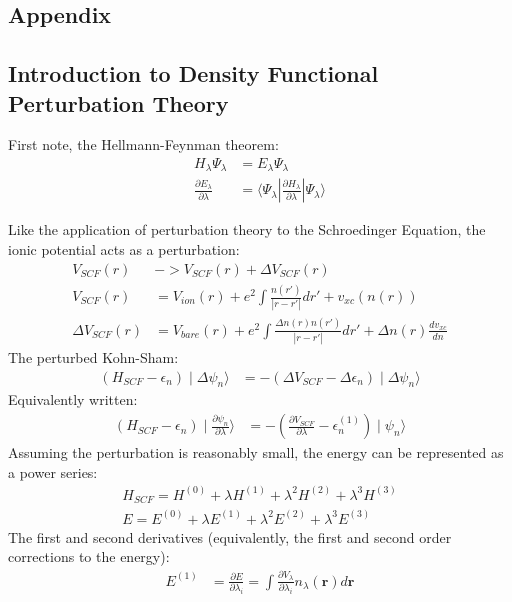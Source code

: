 \documentclass{article}
\numberwithin{equation}{section}
\begin{document}
\begin{spacing}{1.0}
\newpage
\section{Appendix}
\subsection*{Introduction to Density Functional Perturbation Theory}
First note, the Hellmann-Feynman theorem:
\begin{align*}
	H_{\lambda}\Psi_{\lambda}&=E_{\lambda}\Psi_{\lambda}\\
        \frac{\partial E_{\lambda}}{\partial \lambda}&=\langle \Psi_{\lambda}|\frac{\partial H_{\lambda}}{\partial \lambda}|\Psi_{\lambda}\rangle
\end{align*}

Like the application of perturbation theory to the Schroedinger Equation, the ionic potential acts as a perturbation:
\begin{align*}
        V_{SCF}(r)&->V_{SCF}(r)+\Delta V_{SCF}(r)\\
	V_{SCF}(r)&=V_{ion}(r)+e^2\int \frac{n(r')}{|r-r'|}dr'+v_{xc}(n(r))\\
	\Delta V_{SCF}(r)&=V_{bare}(r)+e^2\int \frac{\Delta n(r)n(r')}{|r-r'|}dr'+\Delta n(r)\frac{dv_{xc}}{dn}
\end{align*}
The perturbed Kohn-Sham:
\begin{align*}
	(H_{SCF}-\epsilon_n)\mid\Delta\psi_n\rangle&=-(\Delta V_{SCF}-\Delta \epsilon_n)\mid\Delta\psi_n\rangle
\end{align*}
Equivalently written:
\begin{align*}
	(H_{SCF}-\epsilon_n)\mid\frac{\partial \psi_n}{\partial \lambda}\rangle&=-(\frac{\partial V_{SCF}}{\partial \lambda}-\epsilon_n^{(1)})\mid\psi_n\rangle        
\end{align*}
Assuming the perturbation is reasonably small, the energy can be represented as a power series:
\begin{align*}
	H_{SCF}=H^{(0)}+\lambda H^{(1)}+\lambda^2 H^{(2)}+\lambda^3 H^{(3)}\\
        E=E^{(0)}+\lambda E^{(1)}+\lambda^2 E^{(2)}+\lambda^3 E^{(3)}
\end{align*}
The first and second derivatives (equivalently, the first and second order corrections to the energy):
\begin{align*}
E^{(1)}&=\frac{\partial E}{\partial \lambda_i}=\int \frac{\partial V_{\lambda}}{\partial \lambda_i}n_{\lambda}(\pmb{r})d\pmb{r}\\

\end{align*}
\end{spacing}
\end{document}
